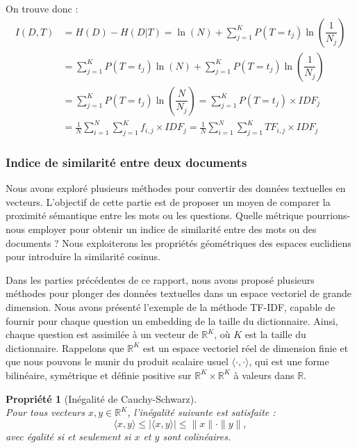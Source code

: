 \documentclass[12pt]{article}
\newtheorem{prop}{Propriété}
\theoremstyle{definition}
\begin{document}
	On trouve donc :
	\begin{align*}
		I(D,T) &= H(D) - H(D|T) = \ln(N) + \sum_{j=1}^{K}P(T=t_j)\ln\left(\dfrac{1}{N_j}\right)\\
			&= \sum_{j=1}^{K}P(T=t_j)\ln(N) + \sum_{j=1}^{K}P(T=t_j)\ln\left(\dfrac{1}{N_j}\right)\\
			&= \sum_{j=1}^{K}P(T=t_j)\ln\left(\dfrac{N}{N_j}\right) = \sum_{j=1}^{K}P(T=t_j) \times IDF_j\\
			&= \frac{1}{N}\sum_{i=1}^{N}\sum_{j=1}^{K} f_{i,j}\times IDF_j = \frac{1}{N}\sum_{i=1}^{N}\sum_{j=1}^{K} TF_{i,j}\times IDF_j
	\end{align*}
	
	
\subsubsection{Indice de similarité entre deux documents}
Nous avons exploré plusieurs méthodes pour convertir des données textuelles en vecteurs. L'objectif de cette partie est de proposer un moyen de comparer la proximité sémantique entre les mots ou les questions. Quelle métrique pourrions-nous employer pour obtenir un indice de similarité entre des mots ou des documents ? Nous exploiterons les propriétés géométriques des espaces euclidiens pour introduire la similarité cosinus.

Dans les parties précédentes de ce rapport, nous avons proposé plusieurs méthodes pour plonger des données textuelles dans un espace vectoriel de grande dimension. Nous avons présenté l'exemple de la méthode TF-IDF, capable de fournir pour chaque question un embedding de la taille du dictionnaire. Ainsi, chaque question est assimilée à un vecteur de $\mathbb{R}^K$, où $K$ est la taille du dictionnaire. Rappelons que $\mathbb{R}^K$ est un espace vectoriel réel de dimension finie et que nous pouvons le munir du produit scalaire usuel $\langle \cdot, \cdot \rangle$, qui est une forme bilinéaire, symétrique et définie positive sur $\mathbb{R}^K \times \mathbb{R}^K$ à valeurs dans $\mathbb{R}$.

\begin{prop}[Inégalité de Cauchy-Schwarz]\hfil\\
	Pour tous vecteurs $x, y \in \mathbb{R}^K$, l'inégalité suivante est satisfaite :
	$$\langle x, y \rangle \leq |\langle x, y \rangle| \leq \|x\| \cdot \|y\|,$$
	avec égalité si et seulement si $x$ et $y$ sont colinéaires.
\end{prop}
  
\end{document}
